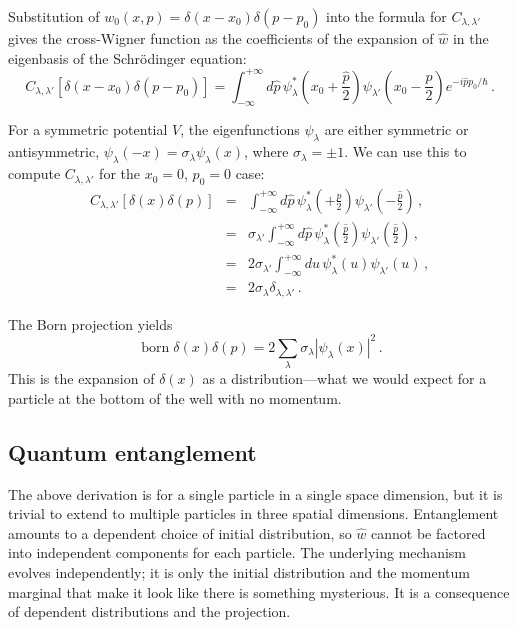 \documentclass[prb,preprint]{revtex4-1}
\DeclareMathOperator\born{born}
\begin{document}
Substitution of $w_0(x,p)=\delta(x-x_0)\delta(p-p_0)$ into the formula for $C_{\lambda,\lambda'}$
gives the cross-Wigner function as the coefficients of the expansion of $\hat{w}$ in the
eigenbasis of the Schr\"odinger equation:
\begin{equation}\label{eq:cross-wigner}
C_{\lambda,\lambda'}[\delta(x-x_0)\delta(p-p_0)] = \int_{-\infty}^{+\infty} d\hat{p} \, \psi_\lambda^*\!\left(x_0+\frac{\hat{p}}{2}\right) \psi_{\lambda'}\!\left(x_0-\frac{\hat{p}}{2}\right) e^{-i\hat{p}p_0/\hbar}\,.
\end{equation}

For a symmetric potential $V$, the eigenfunctions $\psi_\lambda$ are either symmetric or antisymmetric, $\psi_\lambda(-x)=\sigma_\lambda \psi_\lambda(x)$, where $\sigma_\lambda = \pm 1$.  We can use this to compute $C_{\lambda,\lambda'}$ for the $x_0=0$, $p_0=0$ case:
\begin{eqnarray}
  C_{\lambda,\lambda'}[\delta(x)\delta(p)] &=& \int_{-\infty}^{+\infty} d\hat{p} \, \psi_\lambda^*\!\left(+\frac{\hat{p}}{2}\right) \psi_{\lambda'}\!\left(-\frac{\hat{p}}{2}\right) \,, \\
  &=& \sigma_{\lambda'} \int_{-\infty}^{+\infty} d\hat{p} \, \psi_\lambda^*\!\left(\frac{\hat{p}}{2}\right) \psi_{\lambda'}\!\left(\frac{\hat{p}}{2}\right) \,, \\
  &=& 2 \sigma_{\lambda'} \int_{-\infty}^{+\infty} d u \, \psi_\lambda^*(u) \psi_{\lambda'}(u) \,,\\
  &=& 2 \sigma_\lambda \delta_{\lambda,\lambda'} \,.
\end{eqnarray}

The Born projection yields
\begin{equation}
  \born \delta(x) \delta (p) = 2 \sum_{\lambda} \sigma_{\lambda} |\psi_{\lambda}(x)|^2 \,.
\end{equation}
This is the expansion of $\delta(x)$ as a distribution---what we would expect for a particle at the bottom of the well with no momentum.

\subsection{Quantum entanglement}

The above derivation is for a single particle in a single space dimension, but it is trivial to extend to multiple particles in three spatial dimensions.  Entanglement amounts to a dependent choice of initial distribution, so $\hat{w}$ cannot be factored into independent components for each particle.  The underlying mechanism evolves independently; it is only the initial distribution and the momentum marginal that make it look like there is something mysterious.  It is a consequence of dependent distributions and the projection.
\end{document}
